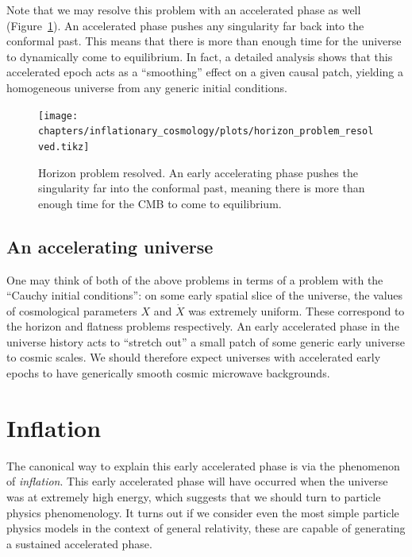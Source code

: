 Note that we may resolve this problem with an accelerated phase as well (Figure~\ref{fig:cos:horizon_problem_resolved}). An accelerated phase pushes any singularity far back into the conformal past. This means that there is more than enough time for the universe to dynamically come to equilibrium. In fact, a detailed analysis shows that this accelerated epoch acts as a ``smoothing'' effect on a given causal patch, yielding a homogeneous universe from any generic initial conditions.


\begin{figure}[tp]
  \centering
  \texttt{[image: chapters/inflationary\_cosmology/plots/horizon\_problem\_resolved.tikz]}
  \caption{Horizon problem resolved. An early accelerating phase pushes the singularity far into the conformal past, meaning there is more than enough time for the CMB to come to equilibrium.\label{fig:cos:horizon_problem_resolved}}
\end{figure}

\subsection{An accelerating universe}
One may think of both of the above problems in terms of a problem with the ``Cauchy initial conditions'': on some early spatial slice of the universe, the values of cosmological parameters $X$ and $\dot{X}$ was extremely uniform. These correspond to the horizon and flatness problems respectively. An early accelerated phase in the universe history acts to ``stretch out'' a small patch of some generic early universe to cosmic scales. We should therefore expect universes with accelerated early epochs to have generically smooth cosmic microwave backgrounds.

\section{Inflation}
The canonical way to explain this early accelerated phase is via the phenomenon of {\em inflation}. This early accelerated phase will have occurred when the universe was at extremely high energy, which suggests that we should turn to particle physics phenomenology.
It turns out if we consider even the most simple particle physics models in the context of general relativity, these are capable of generating a sustained accelerated phase.


